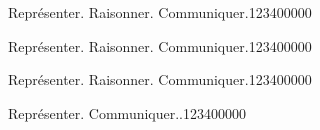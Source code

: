 \begin{pageAD}
\begin{ExoCad}{Représenter. Raisonner. Communiquer.}{1234}{0}{0}{0}{0}{0}

 
 
\end{ExoCad}


\begin{ExoCad}{Représenter. Raisonner. Communiquer.}{1234}{0}{0}{0}{0}{0}

 
 
\end{ExoCad}

\begin{ExoCad}{Représenter. Raisonner. Communiquer.}{1234}{0}{0}{0}{0}{0}

 
 
\end{ExoCad}

\begin{ExoCad}{Représenter. Communiquer..}{1234}{0}{0}{0}{0}{0}

 
 
\end{ExoCad}


 
\end{pageAD}



